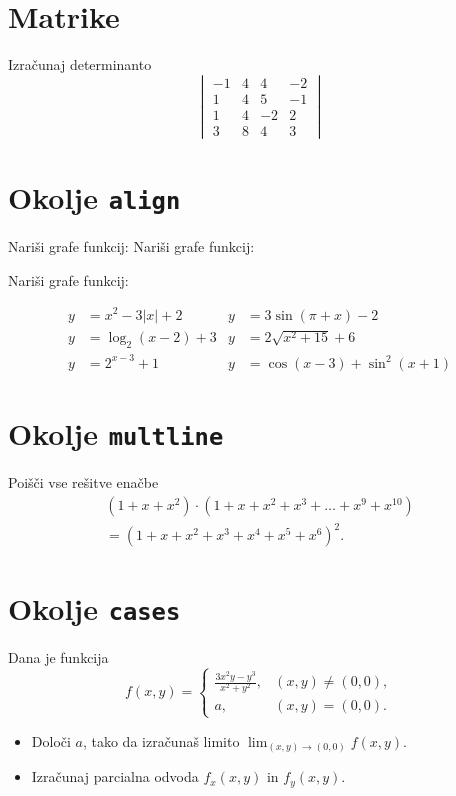\documentclass[a4paper,12pt]{article}
\begin{document}
\section*{Matrike}
Izračunaj determinanto
   \[
\begin{vmatrix}
-1 & 4 & 4 & -2 \\
1 & 4 & 5 & -1 \\
1 & 4 & -2 & 2 \\
3 & 8 & 4 & 3
\end{vmatrix}
\]

\section*{Okolje \texttt{align}}
Nariši grafe funkcij:
Nariši grafe funkcij:

Nariši grafe funkcij:

\begin{align*}
y &= x^2 - 3|x| + 2
    & y &= 3\sin(\pi+x) - 2 \\
y &= \log_2(x-2) + 3
    & y &= 2\sqrt{x^2+15} + 6 \\
y &= 2^{x-3} + 1
    & y &= \cos(x-3) + \sin^2(x+1)
\end{align*}

\section*{Okolje \texttt{multline}}
Poišči vse rešitve enačbe
\begin{multline*}
(1+x+x^2)\cdot(1+x+x^2+x^3+\ldots+x^9+x^{10})\\
=(1+x+x^2+x^3+x^4+x^5+x^6)^2.
\end{multline*}

\section*{Okolje \texttt{cases}}
Dana je funkcija
   \[
f(x,y)=
\begin{cases}
\frac{3x^2y-y^3}{x^2+y^2}, & (x,y)\neq(0,0),\\
a, & (x,y)=(0,0).
\end{cases}
\]

\begin{itemize}
\item Določi \(a\), tako da izračunaš limito \( \lim_{(x,y)\to(0,0)} f(x,y) \).
\item Izračunaj parcialna odvoda \(f_x(x,y)\) in \(f_y(x,y)\).
\end{itemize}
\end{document}
